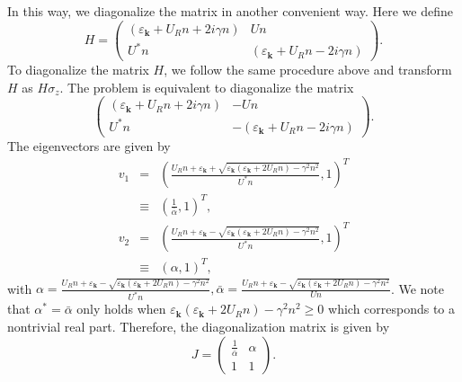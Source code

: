 \documentclass[aps,onecolumn,superscriptaddress,notitlepage,longbibliography]{revtex4-1}
\newcommand{\tmmathbf}[1]{\ensuremath{\boldsymbol{#1}}}
\begin{document}
In this way, we diagonalize the matrix in another convenient way. Here we
define
\begin{equation}
  H = \left(\begin{array}{cc}
    (\varepsilon_{\tmmathbf{k}} + U_R n + 2 i \gamma n) & U n\\
    U^{\ast} n & (\varepsilon_{\tmmathbf{k}} + U_R n - 2 i \gamma n)
  \end{array}\right) .
\end{equation}
To diagonalize the matrix $H$, we follow the same procedure above and
transform $H$ as $H \sigma_z$. The problem is equivalent to diagonalize the
matrix
\begin{equation}
  \left(\begin{array}{cc}
    (\varepsilon_{\tmmathbf{k}} + U_R n + 2 i \gamma n) & - U n\\
    U^{\ast} n & - (\varepsilon_{\tmmathbf{k}} + U_R n - 2 i \gamma n)
  \end{array}\right) .
\end{equation}
The eigenvectors are given by
\begin{eqnarray}
  v_1 & = & \left( \frac{U_R n + \varepsilon_{\tmmathbf{k}} +
  \sqrt{\varepsilon_{\tmmathbf{k}} (\varepsilon_{\tmmathbf{k}} + 2 U_R n) -
  \gamma^2 n^2}}{U^{\ast} n}, 1 \right)^T \nonumber\\
  & \equiv & \left( \frac{1}{\bar{\alpha}}, 1 \right)^T, \\
  v_2 & = & \left( \frac{U_R n + \varepsilon_{\tmmathbf{k}} -
  \sqrt{\varepsilon_{\tmmathbf{k}} (\varepsilon_{\tmmathbf{k}} + 2 U_R n) -
  \gamma^2 n^2}}{U^{\ast} n}, 1 \right)^T \nonumber\\
  & \equiv & (\alpha, 1)^T, 
\end{eqnarray}
with $\alpha = \frac{U_R n + \varepsilon_{\tmmathbf{k}} -
\sqrt{\varepsilon_{\tmmathbf{k}} (\varepsilon_{\tmmathbf{k}} + 2 U_R n) -
\gamma^2 n^2}}{U^{\ast} n}, \bar{\alpha} = \frac{U_R n +
\varepsilon_{\tmmathbf{k}} - \sqrt{\varepsilon_{\tmmathbf{k}}
(\varepsilon_{\tmmathbf{k}} + 2 U_R n) - \gamma^2 n^2}}{U n}$. We note that
$\alpha^{\ast} = \bar{\alpha}$ only holds when $\varepsilon_{\tmmathbf{k}}
(\varepsilon_{\tmmathbf{k}} + 2 U_R n) - \gamma^2 n^2 \geqslant 0$ which
corresponds to a nontrivial real part. Therefore, the diagonalization matrix
is given by
\begin{equation}
  J = \left(\begin{array}{cc}
    \frac{1}{\bar{\alpha}} & \alpha\\
    1 & 1
  \end{array}\right) .
\end{equation}
\end{document}
